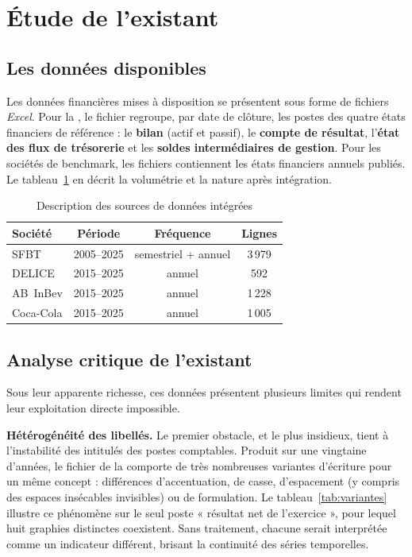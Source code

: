 \section{Étude de l'existant}
\label{sec:existant}

\subsection{Les données disponibles}
\par Les données financières mises à disposition se présentent sous forme de
fichiers \textit{Excel}. Pour la \sfbt, le fichier regroupe, par date de clôture,
les postes des quatre états financiers de référence : le \textbf{bilan} (actif et
passif), le \textbf{compte de résultat}, l'\textbf{état des flux de trésorerie} et
les \textbf{soldes intermédiaires de gestion}. Pour les sociétés de benchmark,
les fichiers contiennent les états financiers annuels publiés. Le
tableau~\ref{tab:sources} en décrit la volumétrie et la nature après intégration.

\begin{table}[H]
  \centering
  \caption[Description des fichiers sources]{Description des sources de données intégrées}
  \label{tab:sources}
  \begin{tabular}{|l|c|c|c|}
    \hline
    \textbf{Société} & \textbf{Période} & \textbf{Fréquence} & \textbf{Lignes} \\ \hline
    SFBT & 2005--2025 & semestriel + annuel & 3\,979 \\ \hline
    DELICE & 2015--2025 & annuel & 592 \\ \hline
    AB~InBev & 2015--2025 & annuel & 1\,228 \\ \hline
    Coca-Cola & 2015--2025 & annuel & 1\,005 \\ \hline
  \end{tabular}
\end{table}

\subsection{Analyse critique de l'existant}
\par Sous leur apparente richesse, ces données présentent plusieurs limites qui
rendent leur exploitation directe impossible.

\par \textbf{Hétérogénéité des libellés.} Le premier obstacle, et le plus
insidieux, tient à l'instabilité des intitulés des postes comptables. Produit sur
une vingtaine d'années, le fichier de la \sfbt comporte de très nombreuses
variantes d'écriture pour un même concept : différences d'accentuation, de casse,
d'espacement (y compris des espaces insécables invisibles) ou de formulation. Le
tableau~\ref{tab:variantes} illustre ce phénomène sur le seul poste
« résultat net de l'exercice », pour lequel huit graphies distinctes coexistent.
Sans traitement, chacune serait interprétée comme un indicateur différent,
brisant la continuité des séries temporelles.

